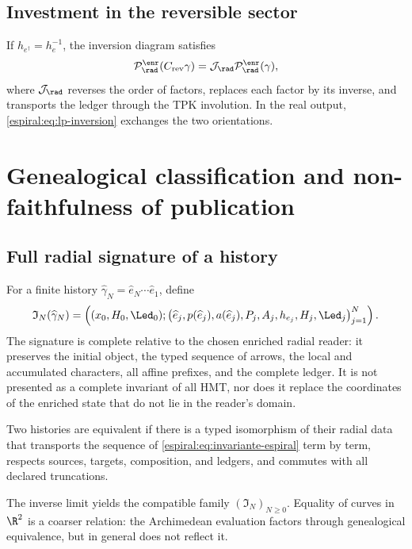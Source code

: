 \section{Investment in the reversible sector}

If \(h_{e^\dagger}=h_e^{-1}\), the inversion diagram satisfies
\[
 \mathcal P_{\rad}^{\enr}(C_{\mathrm{rev}}\gamma)
 =\mathcal J_{\rad}
 \mathcal P_{\rad}^{\enr}(\gamma),
\]
where \(\mathcal J_{\rad}\) reverses the order of factors, replaces each
factor by its inverse, and transports the ledger through the TPK involution. In
the real output, \cref{espiral:eq:lp-inversion} exchanges the two orientations.

\chapter{Genealogical classification and non-faithfulness of publication}

\section{Full radial signature of a history}

For a finite history
\(\widehat\gamma_N=\widehat e_N\cdots\widehat e_1\), define
\begin{equation}
 \mathfrak I_N(\widehat\gamma_N)=
 \left(
 (x_0,H_0,\Led_0);
 \bigl(\widehat e_j,p(\widehat e_j),a(\widehat e_j),P_j,A_j,
 h_{e_j},H_j,\Led_j\bigr)_{j=1}^{N}
 \right).
 \label{espiral:eq:invariante-espiral}
\end{equation}
The signature is complete relative to the chosen enriched radial reader: it preserves
the initial object, the typed sequence of arrows, the local and
accumulated characters, all affine prefixes, and the complete ledger. It is not presented
as a complete invariant of all HMT, nor does it replace the coordinates of the
enriched state that do not lie in the reader's domain.

\begin{definition}
Two histories are equivalent if there is a typed isomorphism of their
radial data that transports the sequence of
\cref{espiral:eq:invariante-espiral} term by term, respects sources, targets, composition, and
ledgers, and commutes with all declared truncations.
\end{definition}

The inverse limit yields the compatible family
\((\mathfrak I_N)_{N\ge0}\). Equality of curves in \(\R^2\) is a
coarser relation: the Archimedean evaluation factors through genealogical
equivalence, but in general does not reflect it.


